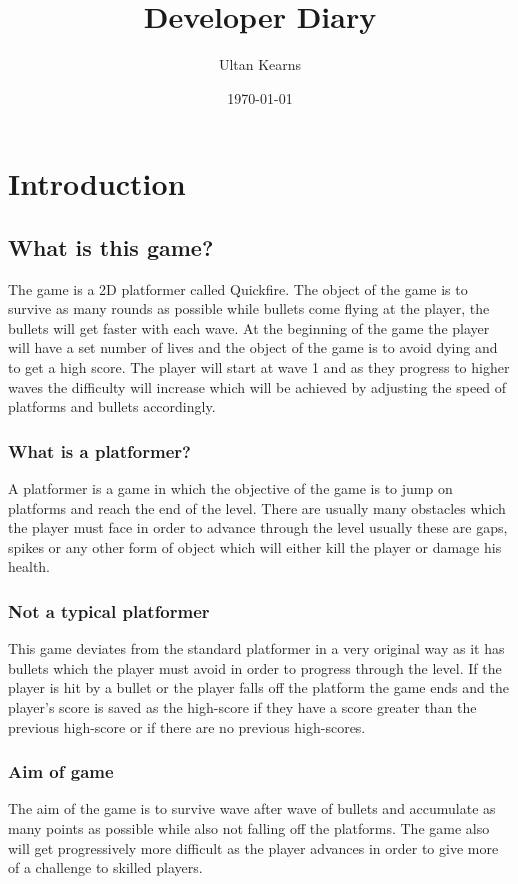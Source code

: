 \documentclass{report}
\title{Developer Diary}
\author{Ultan Kearns}
\date{\today}
\begin{document}
\maketitle
\tableofcontents
\chapter{Introduction}
\section{What is this game?}
The game is a 2D platformer called Quickfire.  
The object of the game is 
to survive as many rounds as possible while bullets come flying at the player, the bullets will get faster with each wave. At the beginning of the game the player will have a set number of lives and the object of the game is to avoid dying and to get a high score. The player will start at wave 1 and as they progress to higher waves the difficulty will increase which will be achieved by adjusting the speed of platforms and bullets accordingly.
\subsection{What is a platformer?}
A platformer is a game in which the objective of the game is to jump on platforms and reach the end of the level\cite{Platformer}.  There are usually many obstacles which the player must face in order to advance through the level usually these are gaps, spikes or any other form of object which will either kill the player or damage his health.
\subsection{Not a typical platformer}
This game deviates from the standard platformer\cite{Platformer} in a very original way as it has bullets which the player must avoid in order to progress through the level.  If the player is hit by a bullet or the player falls off the platform the game ends and the player's score is saved as the high-score if they have a score greater than the previous high-score or if there are no previous high-scores.
\subsection{Aim of game}
The aim of the game is to survive wave after wave of bullets and accumulate as many points as possible while also not falling off the platforms.  The game also will get progressively more difficult as the player advances in order to give more of a challenge to skilled players.
\end{document}

